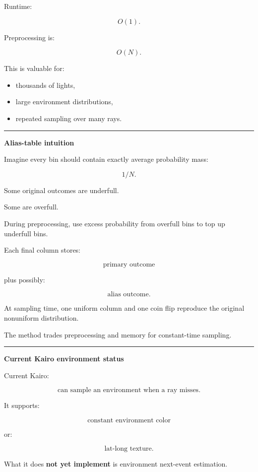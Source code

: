 Runtime:

\[
\boxed{O(1).}
\]

Preprocessing is:

\[
O(N).
\]

This is valuable for:

\begin{itemize}
\tightlist
\item
  thousands of lights,
\item
  large environment distributions,
\item
  repeated sampling over many rays.
\end{itemize}

\begin{center}\rule{0.5\linewidth}{0.5pt}\end{center}

\textbf{Alias-table intuition}

Imagine every bin should contain exactly average probability mass:

\[
1/N.
\]

Some original outcomes are underfull.

Some are overfull.

During preprocessing, use excess probability from overfull bins to top up underfull bins.

Each final column stores:

\[
\text{primary outcome}
\]

plus possibly:

\[
\text{alias outcome}.
\]

At sampling time, one uniform column and one coin flip reproduce the original nonuniform distribution.

The method trades preprocessing and memory for constant-time sampling.

\begin{center}\rule{0.5\linewidth}{0.5pt}\end{center}

\textbf{Current Kairo environment status}

Current Kairo:

\[
\text{can sample an environment when a ray misses}.
\]

It supports:

\[
\text{constant environment color}
\]

or:

\[
\text{lat-long texture}.
\]

What it does \textbf{not yet implement} is environment next-event estimation.

